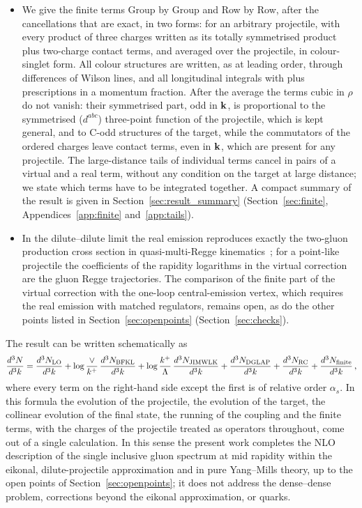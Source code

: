 \begin{itemize}
\item We give the finite terms Group by Group and Row by Row, after the cancellations that are exact, in two forms: for an arbitrary projectile, with every product of three charges written as its totally symmetrised product plus two-charge contact terms, and averaged over the projectile, in colour-singlet form. All colour structures are written, as at leading order, through differences of Wilson lines, and all longitudinal integrals with plus prescriptions in a momentum fraction. After the average the terms cubic in $\rho$ do not vanish: their symmetrised part, odd in $\mathbf{k}$, is proportional to the symmetrised ($d^{abc}$) three-point function of the projectile, which is kept general, and to C-odd structures of the target, while the commutators of the ordered charges leave contact terms, even in $\mathbf{k}$, which are present for any projectile. The large-distance tails of individual terms cancel in pairs of a virtual and a real term, without any condition on the target at large distance; we state which terms have to be integrated together. A compact summary of the result is given in Section~\ref{sec:result_summary} (Section~\ref{sec:finite}, Appendices~\ref{app:finite} and~\ref{app:tails}).
\item In the dilute--dilute limit the real emission reproduces exactly the two-gluon production cross section in quasi-multi-Regge kinematics~\cite{Fadin:1998py,Bartels:2006hg}; for a point-like projectile the coefficients of the rapidity logarithms in the virtual correction are the gluon Regge trajectories. The comparison of the finite part of the virtual correction with the one-loop central-emission vertex, which requires the real emission with matched regulators, remains open, as do the other points listed in Section~\ref{sec:openpoints} (Section~\ref{sec:checks}).
\end{itemize}
The result can be written schematically as
\begin{align}\label{eq:schematic}
\frac{d^3N}{d^3k} = \frac{d^3N_{\rm LO}}{d^3k}
+ \log\frac{\vee}{k^+}\,\frac{d^3N_{\rm BFKL}}{d^3k}
+ \log\frac{k^+}{\Lambda}\,\frac{d^3N_{\rm JIMWLK}}{d^3k}
+ \frac{d^3N_{\rm DGLAP}}{d^3k}
+ \frac{d^3N_{\rm RC}}{d^3k}
+ \frac{d^3N_{\rm finite}}{d^3k}\,,
\end{align}
where every term on the right-hand side except the first is of relative order $\alpha_s$. In this formula the evolution of the projectile, the evolution of the target, the collinear evolution of the final state, the running of the coupling and the finite terms, with the charges of the projectile treated as operators throughout, come out of a single calculation. In this sense the present work completes the NLO description of the single inclusive gluon spectrum at mid rapidity within the eikonal, dilute-projectile approximation and in pure Yang--Mills theory, up to the open points of Section~\ref{sec:openpoints}; it does not address the dense--dense problem, corrections beyond the eikonal approximation, or quarks.

